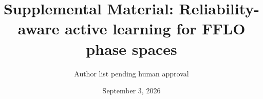 \documentclass[aps,prl,reprint,superscriptaddress]{revtex4-2}
\begin{document}
\title{Supplemental Material: Reliability-aware active learning for FFLO phase spaces}\author{Author list pending human approval}\date{September 3, 2026}\maketitle
\setcounter{figure}{0}\setcounter{table}{0}

\end{document}
